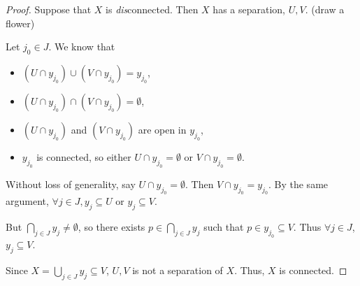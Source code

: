 \begin{proof}
Suppose that $X$ is \textit{dis}connected. Then $X$ has a separation, $U, V$.
\placeholder
(draw a flower)

Let $j_0 \in J$.  We know that
\begin{itemize}
\item $(U\cap y_{j_0}) \cup (V\cap y_{j_0}) = y_{j_0}$,
\item $(U\cap y_{j_0}) \cap (V\cap y_{j_0}) = \emptyset$,
\item $(U\cap y_{j_0})$ and $(V\cap y_{j_0})$ are open in $y_{j_0}$,
\item $y_{j_0}$ is connected, so either $U \cap y_{j_0} = \emptyset$ or $V \cap y_{j_0} = \emptyset$.
\end{itemize}
Without loss of generality, say $U \cap y_{j_0} = \emptyset$. Then $V \cap y_{j_0} = y_{j_0}$.  By the same argument, $\forall j\in J, y_j \subseteq U$ or $y_j \subseteq V$.

But $\displaystyle{\bigcap_{j \in J} y_j} \neq \emptyset$,  so there exists $p\in \displaystyle{\bigcap_{j \in J} y_j}$ such that $p\in y_{j_0} \subseteq V$.  Thus $\forall j\in J$, $y_j \subseteq V$.

Since $X = \displaystyle{\bigcup_{j \in J} y_j} \subseteq V$, $U, V$ is not a separation of $X$.  Thus, $X$ is connected.
\end{proof}

